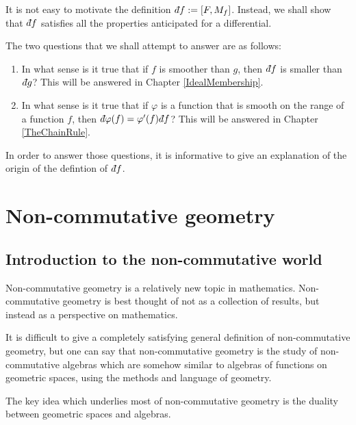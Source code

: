 It is not easy to motivate the definition $\qd f := [F,M_f]$. Instead,
we shall show that $\qd f$ satisfies all the properties
anticipated for a differential. 

The two questions that we shall attempt to answer are as follows:
\begin{enumerate}
    \item{} In what sense is it true that if $f$ is smoother than $g$, then $\qd f$
    is smaller than $\qd g$? This will be answered in Chapter \ref{IdealMembership}.
    \item{} In what sense is it true that if $\varphi$ is a function that is smooth
    on the range of a function $f$, then $\qd \varphi(f) = \varphi'(f)\qd f$? This
    will be answered in Chapter \ref{TheChainRule}.
\end{enumerate}

In order to answer those questions, it is informative to give an explanation
of the origin of the defintion of $\qd f$. 

\section{Non-commutative geometry}

\subsection{Introduction to the non-commutative world}
Non-commutative geometry is a relatively new topic in mathematics. Non-commutative
geometry is best thought of not as a collection of results, but instead as a
perspective on mathematics. 

It is difficult to give a completely satisfying general definition of non-commutative geometry, but 
one can say that non-commutative geometry is the study of non-commutative algebras
which are somehow similar to algebras of functions on geometric spaces, using
the methods and language of geometry.

The key idea which underlies most of non-commutative geometry is the duality
between geometric spaces and algebras. 

